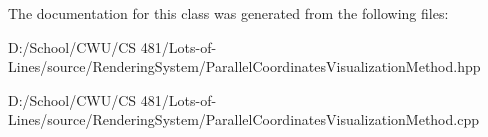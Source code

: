The documentation for this class was generated from the following files\+:\begin{DoxyCompactItemize}
\item 
D\+:/\+School/\+C\+W\+U/\+C\+S 481/\+Lots-\/of-\/\+Lines/source/\+Rendering\+System/Parallel\+Coordinates\+Visualization\+Method.\+hpp\item 
D\+:/\+School/\+C\+W\+U/\+C\+S 481/\+Lots-\/of-\/\+Lines/source/\+Rendering\+System/Parallel\+Coordinates\+Visualization\+Method.\+cpp\end{DoxyCompactItemize}
